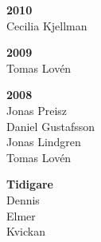 {\begin{multicols}{2}
\textbf{2010}\\
Cecilia Kjellman

\textbf{2009}\\
Tomas Lovén

\textbf{2008}\\
Jonas Preisz\\
Daniel Gustafsson\\
Jonas Lindgren\\
Tomas Lovén

\textbf{Tidigare}\\
Dennis\\
Elmer\\
Kvickan

\end{multicols}
}
